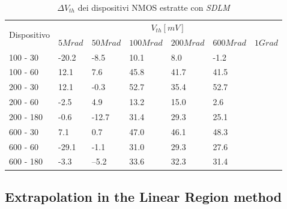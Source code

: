 \documentclass[12pt, letterpaper]{book}
\begin{document}
\begin{table}[H]
  \renewcommand{\arraystretch}{1.3}
  \begin{tabular}{m{2cm}  m{1.1cm} m{1.3cm} m{1.5cm} m{1.5cm} m{1.5cm} m{1cm}}
    \toprule
    \multirow{2}{*}{Dispositivo} & \multicolumn{6}{c}{$V_{th} [mV] $}                                                          \\
    \cmidrule{2-7}
                                 & $5Mrad$                            & $50Mrad$ & $100Mrad$ & $200Mrad$ & $600Mrad$ & $1Grad$ \\
    \midrule
    100 - 30                     & -20.2                              & -8.5     & 10.1      & 8.0       & -1.2      &         \\
    \hline
    100 - 60                     & 12.1                               & 7.6      & 45.8      & 41.7      & 41.5      &         \\
    \hline
    200 - 30                     & 12.1                               & -0.3     & 52.7      & 35.4      & 52.7      &         \\
    \hline
    200 - 60                     & -2.5                               & 4.9      & 13.2      & 15.0      & 2.6       &         \\
    \hline
    200 - 180                    & -0.6                               & -12.7    & 31.4      & 29.3      & 25.1      &         \\
    \hline
    600 - 30                     & 7.1                                & 0.7      & 47.0      & 46.1      & 48.3      &         \\
    \hline
    600 - 60                     & -29.1                              & -1.1     & 31.0      & 29.3      & 27.6      &         \\
    \hline
    600 - 180                    & -3.3                               & --5.2    & 33.6      & 32.3      & 31.4      &         \\
    \bottomrule
  \end{tabular}
  \caption{$\Delta V_{th}$ dei dispositivi NMOS estratte con \emph{SDLM}}
  \label{tab:deltaVthSDLMN}
\end{table}








\subsection{Extrapolation in the Linear Region method}
\end{document}
